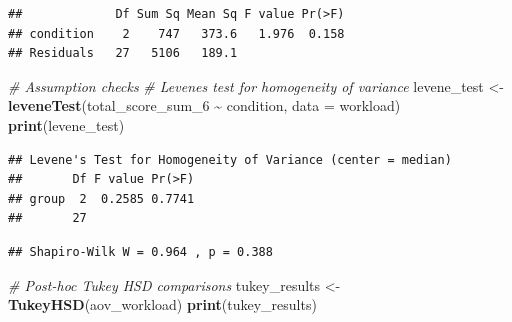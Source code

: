 \documentclass[
]{article}
\newenvironment{Shaded}{\begin{snugshade}}{\end{snugshade}}
\newcommand{\AttributeTok}[1]{\textcolor[rgb]{0.13,0.29,0.53}{#1}}
\newcommand{\CommentTok}[1]{\textcolor[rgb]{0.56,0.35,0.01}{\textit{#1}}}
\newcommand{\DecValTok}[1]{\textcolor[rgb]{0.00,0.00,0.81}{#1}}
\newcommand{\FunctionTok}[1]{\textcolor[rgb]{0.13,0.29,0.53}{\textbf{#1}}}
\newcommand{\NormalTok}[1]{#1}
\newcommand{\OtherTok}[1]{\textcolor[rgb]{0.56,0.35,0.01}{#1}}
\newcommand{\SpecialCharTok}[1]{\textcolor[rgb]{0.81,0.36,0.00}{\textbf{#1}}}
\newcommand{\StringTok}[1]{\textcolor[rgb]{0.31,0.60,0.02}{#1}}
\begin{document}
\begin{verbatim}
##             Df Sum Sq Mean Sq F value Pr(>F)
## condition    2    747   373.6   1.976  0.158
## Residuals   27   5106   189.1
\end{verbatim}

\begin{Shaded}
\begin{Highlighting}[]
\CommentTok{\# Assumption checks}
\CommentTok{\# Levene\textquotesingle{}s test for homogeneity of variance}
\NormalTok{levene\_test }\OtherTok{\textless{}{-}} \FunctionTok{leveneTest}\NormalTok{(total\_score\_sum\_6 }\SpecialCharTok{\textasciitilde{}}\NormalTok{ condition, }\AttributeTok{data =}\NormalTok{ workload)}
\FunctionTok{print}\NormalTok{(levene\_test)}
\end{Highlighting}
\end{Shaded}

\begin{verbatim}
## Levene's Test for Homogeneity of Variance (center = median)
##       Df F value Pr(>F)
## group  2  0.2585 0.7741
##       27
\end{verbatim}

\begin{Shaded}
\end{Shaded}

\begin{verbatim}
## Shapiro-Wilk W = 0.964 , p = 0.388
\end{verbatim}

\begin{Shaded}
\begin{Highlighting}[]
\CommentTok{\# Post{-}hoc Tukey HSD comparisons}
\NormalTok{tukey\_results }\OtherTok{\textless{}{-}} \FunctionTok{TukeyHSD}\NormalTok{(aov\_workload)}
\FunctionTok{print}\NormalTok{(tukey\_results)}
\end{Highlighting}
\end{Shaded}
\end{document}
